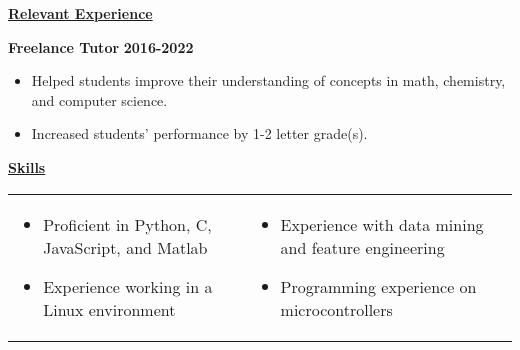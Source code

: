 \documentclass[11pt]{article}
\begin{document}

   \vspace{0.5cm}
   \noindent\underline{\textbf{Relevant Experience}}
   \vspace{0.25cm}

   \begin{minipage}{0.95\textwidth}
      \textbf{Freelance Tutor} \hfill \textbf{2016-2022}

      \vspace{-0.25cm}

      \begin{itemize}\setlength\itemsep{-0.2cm}
         \item Helped students improve their understanding of concepts in math, chemistry, and computer science.
         \item Increased students' performance by 1-2 letter grade(s).
   
      \end{itemize}

   \end{minipage}



   \vspace{0.5cm}
   \noindent\underline{\textbf{Skills}}\\
   \vspace{-0.25cm}

   \begin{minipage}{0.95\textwidth}
      \vspace{-0.75cm}

      \begin{tabular}{p{} p{}}
         
         \begin{itemize}\setlength\itemsep{-0.15cm}
            \setlength{\itemindent}{-0.5em}
            \item Proficient in Python, C, JavaScript, and Matlab
            \item Experience working in a Linux environment
         \end{itemize}
         & 
         \begin{itemize}\setlength\itemsep{-0.15cm}
            \setlength{\itemindent}{-0.5em}
            \item Experience with data mining and feature engineering
            \item Programming experience on microcontrollers
         \end{itemize}
     
        \end{tabular}
   \end{minipage}
   
\end{document}
